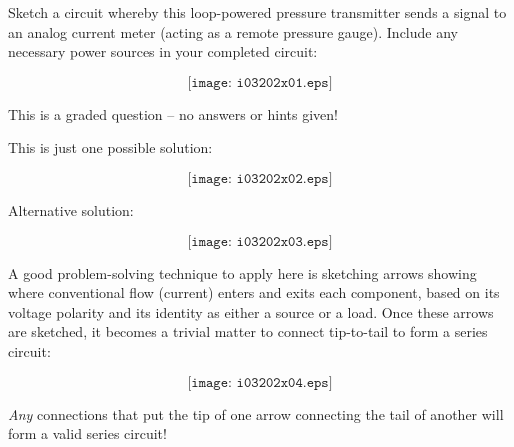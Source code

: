 

Sketch a circuit whereby this loop-powered pressure transmitter sends a signal to an analog current meter (acting as a remote pressure gauge).  Include any necessary power sources in your completed circuit:

\vskip 50pt

$$\texttt{[image: i03202x01.eps]}$$

\vfil 

\eject






This is a graded question -- no answers or hints given!







This is just one possible solution:

$$\texttt{[image: i03202x02.eps]}$$

\vskip 10pt

Alternative solution:

$$\texttt{[image: i03202x03.eps]}$$

\vskip 10pt

\filbreak

A good problem-solving technique to apply here is sketching arrows showing where conventional flow (current) enters and exits each component, based on its voltage polarity and its identity as either a source or a load.  Once these arrows are sketched, it becomes a trivial matter to connect tip-to-tail to form a series circuit:

$$\texttt{[image: i03202x04.eps]}$$

{\it Any} connections that put the tip of one arrow connecting the tail of another will form a valid series circuit!




